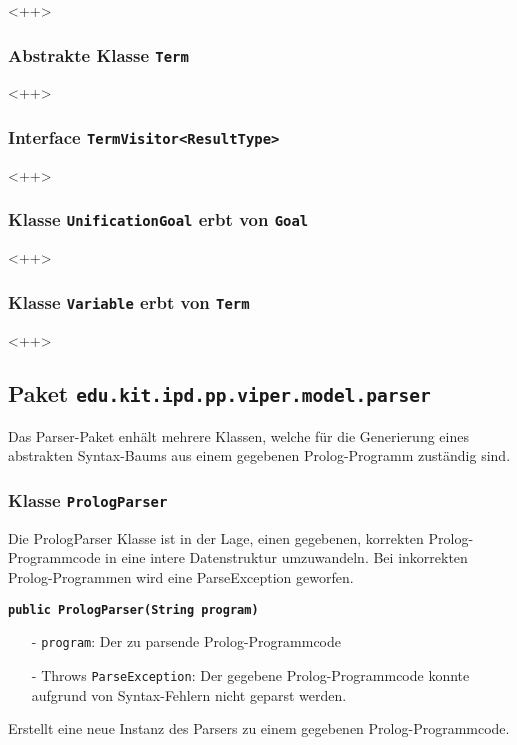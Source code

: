 \documentclass[parskip=full,11pt,twoside]{scrartcl}
\begin{document}
<++>

\subsubsection{Abstrakte Klasse \texttt{Term}}

<++>

\subsubsection{Interface \texttt{TermVisitor<ResultType>}}

<++>

\subsubsection{Klasse \texttt{UnificationGoal} erbt von \texttt{Goal}}

<++>

\subsubsection{Klasse \texttt{Variable} erbt von \texttt{Term}}

<++>

\subsection{Paket \texttt{edu.kit.ipd.pp.viper.model.parser}}

Das Parser-Paket enhält mehrere Klassen, welche für die Generierung eines abstrakten Syntax-Baums aus einem gegebenen Prolog-Programm zuständig sind.

\subsubsection{Klasse \texttt{PrologParser}}

Die PrologParser Klasse ist in der Lage, einen gegebenen, korrekten Prolog-Programmcode in eine intere Datenstruktur umzuwandeln. Bei inkorrekten Prolog-Programmen wird eine ParseException geworfen.

\textbf{\texttt{public PrologParser(String program)}}
\begin{itemize}[noitemsep]
	\item[-] \texttt{program}: Der zu parsende Prolog-Programmcode
	\item[-] Throws \texttt{ParseException}: Der gegebene Prolog-Programmcode konnte aufgrund von Syntax-Fehlern nicht geparst werden.
\end{itemize}
Erstellt eine neue Instanz des Parsers zu einem gegebenen Prolog-Programmcode.
\end{document}
